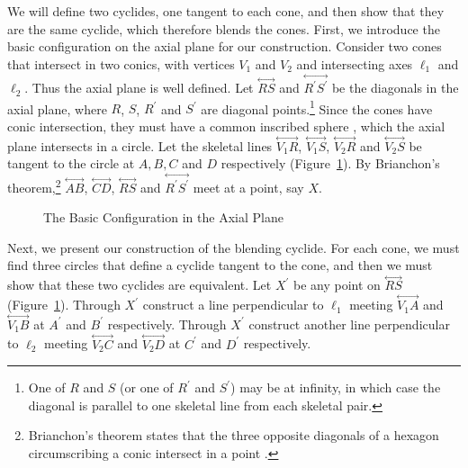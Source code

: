 We will define two cyclides, one tangent to each cone, and then show that
they are the same cyclide, which therefore blends the cones.
First, we introduce the basic configuration on the axial plane for our
construction.
Consider two cones that intersect in two conics, with vertices $V_1$ and
$V_2$ and intersecting axes $\ell_1$ and $\ell_2$.
Thus the axial plane is well defined.
Let $\stackrel{\longleftrightarrow}{RS}$ and 
$\stackrel{\longleftrightarrow}{R^\prime S^\prime}$ be the diagonals in the 
axial plane, where $R$, $S$, $R^\prime$ and $S^\prime$ are diagonal 
points.\footnote{One of $R$ and $S$ (or one of $R^\prime$ and $S^\prime$)
	may be at infinity, in which case the diagonal is parallel to one
	skeletal line from each skeletal pair.}
Since the cones have conic intersection, they must have a common inscribed
sphere \cite{shene-johnstone:1991a}, 
which the axial plane intersects in a circle.
Let the skeletal lines 
$\stackrel{\longleftrightarrow}{V_1R}$, $\stackrel{\longleftrightarrow}{V_1S}$,
$\stackrel{\longleftrightarrow}{V_2R}$ and 
$\stackrel{\longleftrightarrow}{V_2S}$ be tangent to the circle at $A, B, C$ 
and $D$ respectively (Figure~\ref{fig:int-config}).  By Brianchon's 
theorem,\footnote{Brianchon's theorem states that the 
	three opposite diagonals of a
	hexagon circumscribing a conic intersect in a point 
	\cite{johnson:1929}.}
$\stackrel{\longleftrightarrow}{AB}$, $\stackrel{\longleftrightarrow}{CD}$,
$\stackrel{\longleftrightarrow}{RS}$ and
$\stackrel{\longleftrightarrow}{R^\prime S^\prime}$ meet at a point, say $X$.

\begin{figure}
\vspace{6.5cm}
\caption{The Basic Configuration in the Axial Plane}
\label{fig:int-config}
\end{figure}

Next, we present our construction of the blending cyclide.
For each cone, we must find three circles that define a cyclide tangent
to the cone, and then we must show that these two cyclides are equivalent.
Let $X^\prime$ be any point on $\stackrel{\longleftrightarrow}{RS}$
(Figure~\ref{fig:int-config}).
Through $X^\prime$ construct a line perpendicular to $\ell_1$ 
meeting $\stackrel{\longleftrightarrow}{V_1A}$ and
$\stackrel{\longleftrightarrow}{V_1B}$ at $A^\prime$ and $B^\prime$
respectively.
Through $X^\prime$ construct another line perpendicular to $\ell_2$ 
meeting $\stackrel{\longleftrightarrow}{V_2C}$ and
$\stackrel{\longleftrightarrow}{V_2D}$ at $C^\prime$ and $D^\prime$
respectively.

